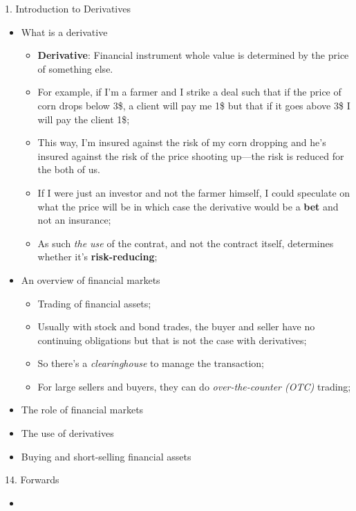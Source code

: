 \begin{CHPT_SUMM_AUTO}[label = {L.-1}]{1. Introduction to Derivatives}
	\begin{itemize}
	\item	What is a derivative
		\begin{itemize}
		\item	\textbf{Derivative}: Financial \og instrument \fg{} whole value is determined by the price of something else.
		\item	For example, if I'm a farmer and I strike a deal such that if the price of corn drops below 3\$, a client will pay me 1\$ but that if it goes above 3\$ I will pay the client 1\$;
		\item[]	This way, I'm insured against the risk of my corn dropping and he's insured against the risk of the price shooting up---the risk is reduced for the both of us.
		\item	If I were just an investor and not the farmer himself, I could speculate on what the price will be in which case the derivative would be a \textbf{bet} and not an insurance;
		\item	As such \textit{the use} of the contrat, and not the contract itself, determines whether it's \textbf{risk-reducing};
		\end{itemize}
	\item	An overview of financial markets
		\begin{itemize}
		\item	Trading of financial assets;
			\item	Usually with stock and bond trades, the buyer and seller have no continuing obligations but that is not the case with derivatives;
			\item	So there's a \textit{clearinghouse} to manage the transaction;
		\item	For large sellers and buyers, they can do \textit{over-the-counter (OTC)} trading;
		
		\end{itemize}
	\item	The role of financial markets
	\item	The use of derivatives
	\item	Buying and short-selling financial assets
	\end{itemize}
\end{CHPT_SUMM_AUTO}

\begin{CHPT_SUMM_AUTO}[label = {L.-14}]{14. Forwards}
	\begin{itemize}
		\item	
	\end{itemize}
\end{CHPT_SUMM_AUTO}

